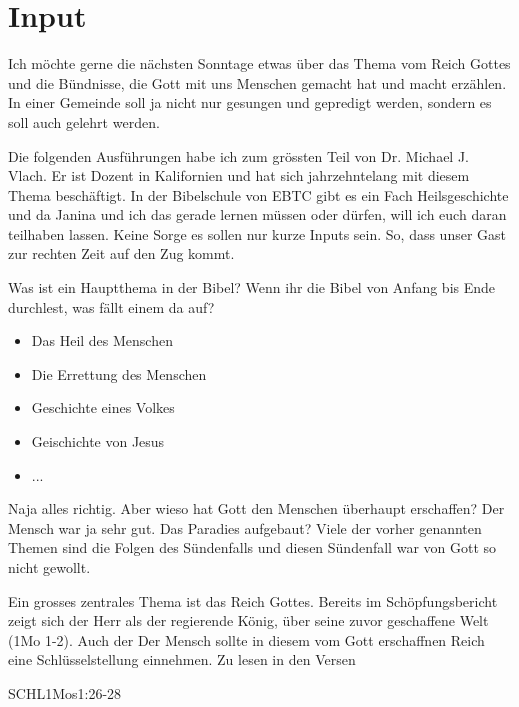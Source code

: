\documentclass{../../inc/mybib}
\begin{document}
\section{ Input }
\begin{spacing}{1.5}    
    \begin{block}[Einleitung]
        Ich möchte gerne die nächsten Sonntage etwas über das Thema vom Reich Gottes und die Bündnisse, die Gott mit uns Menschen gemacht hat und macht erzählen. In einer Gemeinde soll ja nicht nur gesungen und gepredigt werden, sondern es soll auch gelehrt werden.
    \end{block}
        
    \begin{block}[Erklärung]
        Die folgenden Ausführungen habe ich zum grössten Teil von Dr. Michael J. Vlach. Er ist Dozent in Kalifornien und hat sich jahrzehntelang mit diesem Thema beschäftigt. In der Bibelschule von EBTC gibt es ein Fach Heilsgeschichte und da Janina und ich das gerade lernen müssen oder dürfen, will ich euch daran teilhaben lassen. Keine Sorge es sollen nur kurze Inputs sein. So, dass unser Gast zur rechten Zeit auf den Zug kommt.
  \end{block}
  
   \begin{block}
   Was ist ein Hauptthema in der Bibel? Wenn ihr die Bibel von Anfang bis Ende durchlest, was fällt einem da auf?
   \begin{itemize}
    \item Das Heil des Menschen
    \item Die Errettung des Menschen
    \item Geschichte eines Volkes
    \item Geischichte von Jesus
    \item ...
   \end{itemize}
   Naja alles richtig. Aber wieso hat Gott den Menschen überhaupt erschaffen? Der Mensch war ja sehr gut. Das Paradies aufgebaut? Viele der vorher genannten Themen sind die Folgen des Sündenfalls und diesen Sündenfall war von Gott so nicht gewollt. 
   \end{block}
   Ein grosses zentrales Thema ist das Reich Gottes. Bereits im Schöpfungsbericht zeigt sich der Herr als der regierende König, über seine zuvor geschaffene Welt (1Mo 1-2). Auch der
   Der Mensch sollte in diesem vom Gott erschaffnen Reich eine Schlüsselstellung einnehmen. Zu lesen in den Versen
    \begin{bibelbox}{SCHL}{1Mos}{1:26-28}
      

\end{bibelbox}
\end{spacing}
\end{document}
